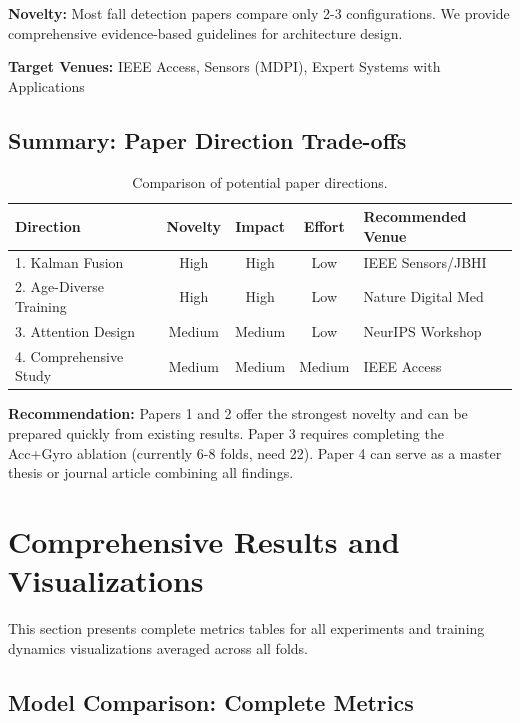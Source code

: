 \documentclass{article}
\begin{document}
\textbf{Novelty:} Most fall detection papers compare only 2-3 configurations. We provide comprehensive evidence-based guidelines for architecture design.

\textbf{Target Venues:} IEEE Access, Sensors (MDPI), Expert Systems with Applications

\subsection{Summary: Paper Direction Trade-offs}

\begin{table}[htbp]
    \centering
    \caption{Comparison of potential paper directions.}
    \label{tab:paper_directions}
    \begin{tabular}{lcccl}
        \toprule
        \textbf{Direction} & \textbf{Novelty} & \textbf{Impact} & \textbf{Effort} & \textbf{Recommended Venue} \\
        \midrule
        1. Kalman Fusion & High & High & Low & IEEE Sensors/JBHI \\
        2. Age-Diverse Training & High & High & Low & Nature Digital Med \\
        3. Attention Design & Medium & Medium & Low & NeurIPS Workshop \\
        4. Comprehensive Study & Medium & Medium & Medium & IEEE Access \\
        \bottomrule
    \end{tabular}
\end{table}

\textbf{Recommendation:} Papers 1 and 2 offer the strongest novelty and can be prepared quickly from existing results. Paper 3 requires completing the Acc+Gyro ablation (currently 6-8 folds, need 22). Paper 4 can serve as a master thesis or journal article combining all findings.

\section{Comprehensive Results and Visualizations}
\label{sec:comprehensive}

This section presents complete metrics tables for all experiments and training dynamics visualizations averaged across all folds.

\subsection{Model Comparison: Complete Metrics}
\end{document}
